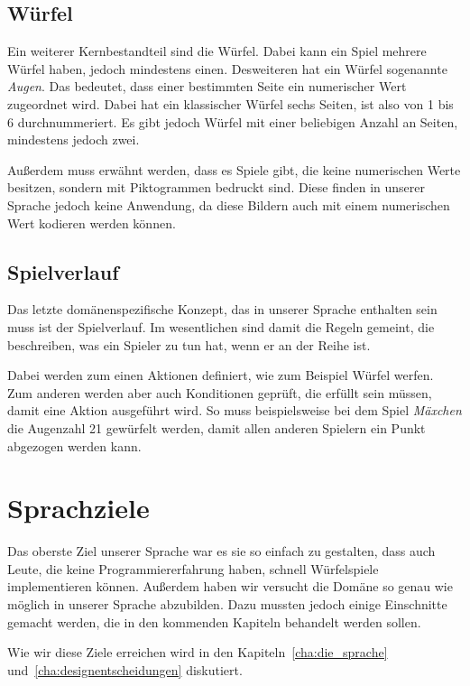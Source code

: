 \documentclass[a4paper, oneside]{book}
\begin{document}
            \subsection{Würfel}
            \label{sub:wurfel}
                Ein weiterer Kernbestandteil sind die Würfel. Dabei kann ein Spiel mehrere Würfel haben, jedoch mindestens einen. Desweiteren hat ein Würfel sogenannte \emph{Augen}. Das bedeutet, dass einer bestimmten Seite ein numerischer Wert zugeordnet wird. Dabei hat ein klassischer Würfel sechs Seiten, ist also von 1 bis 6 durchnummeriert. Es gibt jedoch Würfel mit einer beliebigen Anzahl an Seiten, mindestens jedoch zwei.

                Außerdem muss erwähnt werden, dass es Spiele gibt, die keine numerischen Werte besitzen, sondern mit Piktogrammen bedruckt sind. Diese finden in unserer Sprache jedoch keine Anwendung, da diese Bildern auch mit einem numerischen Wert kodieren werden können.
			\subsection{Spielverlauf}
			\label{sub:spielverlauf}
				Das letzte domänenspezifische Konzept, das in unserer Sprache enthalten sein muss ist der Spielverlauf. Im wesentlichen sind damit die Regeln gemeint, die beschreiben, was ein Spieler zu tun hat, wenn er an der Reihe ist.
				
				Dabei werden zum einen Aktionen definiert, wie zum Beispiel Würfel werfen. Zum anderen werden aber auch Konditionen geprüft, die erfüllt sein müssen, damit eine Aktion ausgeführt wird. So muss beispielsweise bei dem Spiel \emph{Mäxchen} die Augenzahl 21 gewürfelt werden, damit allen anderen Spielern ein Punkt abgezogen werden kann.
			
		\section{Sprachziele}
		\label{sec:sprachziele}
			Das oberste Ziel unserer Sprache war es sie so einfach zu gestalten, dass auch Leute, die keine Programmiererfahrung haben, schnell Würfelspiele implementieren können. Außerdem haben wir versucht die Domäne so genau wie möglich in unserer Sprache abzubilden. Dazu mussten jedoch einige Einschnitte gemacht werden, die in den kommenden Kapiteln behandelt werden sollen.
			
			Wie wir diese Ziele erreichen wird in den Kapiteln~\ref{cha:die_sprache} und~\ref{cha:designentscheidungen} diskutiert.
\end{document}
